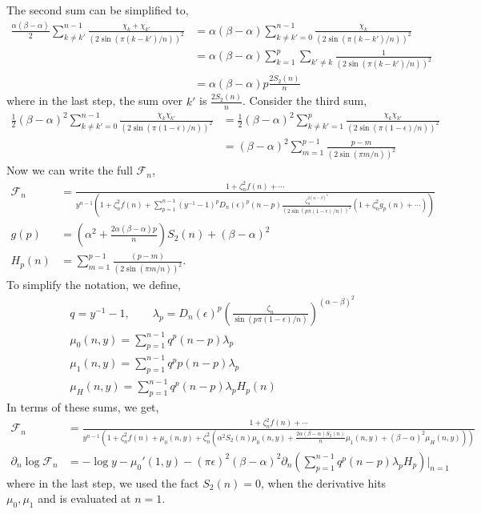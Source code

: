 \documentclass[11pt]{article}
\newcommand{\ep}{\epsilon}
\newcommand{\p}{\partial}
\newcommand{\lb}{\left(}
\newcommand{\rb}{\right)}
\begin{document}
The second sum can be simplified to,
\begin{align}
     \frac{\alpha (\beta - \alpha) }{2}\sum_{k\neq k'}^{n-1}\frac{\chi_k + \chi_{k'}}{\lb2\sin (\pi (k-k')/n)\rb^2} &= \alpha (\beta - \alpha) \sum_{k\neq k' = 0}^{n-1} \frac{\chi_k}{\lb2\sin (\pi (k-k')/n)\rb^2} \\
     &=\alpha (\beta - \alpha) \sum_{k=1}^p \sum_{k'\neq k} \frac{1}{\lb2\sin (\pi (k-k')/n)\rb^2}\\
     &= \alpha (\beta - \alpha)p \frac{2S_2(n)}{n}
\end{align}
where in the last step, the sum over $k'$ is $\frac{2S_2(n)}{n}$. Consider the third sum,
\begin{align}
    \frac{1}{2}(\beta - \alpha)^2 \sum_{k\neq k'=0}^{n-1} \frac{\chi_k \chi_{k'}}{\lb2\sin (\pi (1-\ep)/n)\rb^2} &= \frac{1}{2}(\beta - \alpha)^2 \sum_{k\neq k'=1}^{p} \frac{\chi_k \chi_{k'}}{\lb2\sin (\pi (1-\ep)/n)\rb^2} \\
    &= (\beta-\alpha)^2 \sum_{m=1}^{p-1} \frac{p-m}{\lb2\sin(\pi m /n)\rb^2}
\end{align}
Now we can write the full $\mathcal{F}_n$,
\begin{align}
    \mathcal{F}_n &= \frac
    {1+\zeta_n^{2}f(n)+\cdots}{y^{n-1}\lb 1+\zeta_n^2f(n) + \sum_{p=1}^{n-1} (y^{-1}-1)^pD_n(\ep)^p (n-p) \frac{\zeta_n^{2(\alpha-\beta)^2}}{\lb 2\sin \lb p\pi (1-\ep)/n\rb\rb^2}\lb 1+\zeta_n^2 g_p(n) + \cdots \rb\rb } \\
    g(p) & = \lb  \alpha^2 + \frac{2\alpha (\beta - \alpha)p}{n}\rb S_2(n)  +(\beta - \alpha)^2 \\
    H_p(n) &= \sum_{m=1}^{p-1} \frac{(p-m)}{\lb 2\sin (\pi m /n)\rb^2}.
\end{align}
To simplify the notation, we define,
\begin{align}
    &q = y^{-1}-1, \qquad \lambda_p = D_n(\ep)^p \lb \frac{\zeta_n}{\sin(p \pi (1-\ep)/n)}\rb^{(\alpha - \beta)^2} \\
    &\mu_0(n,y) = \sum_{p=1}^{n-1} q^p (n-p)\lambda_p \\
    & \mu_1(n,y) = \sum_{p=1}^{n-1}q^p p(n-p) \lambda_p \\
    &\mu_H(n,y) = \sum_{p=1}^{n-1} q^p (n-p) \lambda_p H_p(n)
\end{align}
In terms of these sums, we get,
\begin{align}
    \mathcal{F}_n &= \frac{1 + \zeta_n^2 f(n)+\cdots}{y^{n-1}\lb  1+ \zeta_n^2 f(n) + \mu_0(n,y) + \zeta_n^2\lb  \alpha^2 S_2(n) \mu_0(n,y)+ \frac{2\alpha (\beta - \alpha)S_2(n)}{n} \mu_1(n,y) + (\beta - \alpha)^2 \mu_H(n,y)\rb \rb} \\
    \p_n \log \mathcal{F}_n &= -\log y - \mu_0'(1,y) - (\pi \ep)^2 (\beta - \alpha)^2 \p_n \lb \sum_{p=1}^{n-1} q^p (n-p) \lambda_p H_p \rb \Bigg|_{n=1}
\end{align}
where in the last step, we used the fact $S_2(n)=0$, when the derivative hits $\mu_0,\mu_1$ and is evaluated at $n=1$. 
\end{document}
